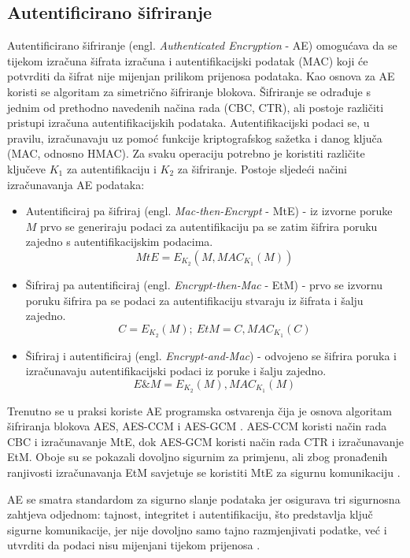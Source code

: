 \subsection{Autentificirano šifriranje}
Autentificirano šifriranje (engl. \emph{Authenticated Encryption} - AE) omogućava
da se tijekom izračuna šifrata izračuna i autentifikacijski podatak (MAC) koji
će potvrditi da šifrat nije mijenjan prilikom prijenosa podataka. Kao osnova za
AE koristi se algoritam za simetrično šifriranje blokova. Šifriranje se
odrađuje s jednim od prethodno navedenih načina rada (CBC, CTR), ali postoje različiti
pristupi izračuna autentifikacijskih podataka. Autentifikacijski podaci se, u
pravilu, izračunavaju uz pomoć funkcije kriptografskog sažetka i danog ključa
(MAC, odnosno HMAC). Za svaku operaciju potrebno je koristiti različite
ključeve $K_1$ za autentifikaciju i $K_2$ za šifriranje. Postoje sljedeći načini
izračunavanja AE podataka:
\begin{itemize}
\item Autentificiraj pa šifriraj (engl. \emph{Mac-then-Encrypt} - MtE) - iz izvorne
poruke $M$ prvo se generiraju podaci za autentifikaciju pa se zatim šifrira poruku
zajedno s autentifikacijskim podacima.
$$MtE=E_{K_2}(M,MAC_{K_1}(M))$$
\item Šifriraj pa autentificiraj (engl. \emph{Encrypt-then-Mac} - EtM) - prvo se
izvornu poruku šifrira pa se podaci za autentifikaciju stvaraju iz šifrata i
šalju zajedno.
$$C=E_{K_2}(M);\ EtM=C,MAC_{K_1}(C)$$
\item Šifriraj i autentificiraj (engl. \emph{Encrypt-and-Mac}) - odvojeno se
šifrira poruka i izračunavaju autentifikacijski podaci iz poruke i šalju
zajedno.
$$E\&M=E_{K_2}(M),MAC_{K_1}(M)$$
\end{itemize}

Trenutno se u praksi koriste AE programska ostvarenja čija je osnova algoritam
šifriranja
blokova AES, AES-CCM \cite{rfc6655} i AES-GCM \cite{rfc5288}. AES-CCM koristi
način rada CBC i izračunavanje MtE, dok AES-GCM koristi način rada CTR i
izračunavanje EtM. Oboje su se pokazali dovoljno sigurnim za primjenu, ali zbog
pronađenih ranjivosti izračunavanja EtM savjetuje se koristiti MtE za sigurnu
komunikaciju \cite{rfc7366}.

AE se smatra standardom za sigurno slanje podataka jer osigurava tri sigurnosna
zahtjeva odjednom: tajnost, integritet i autentifikaciju, što predstavlja ključ
sigurne komunikacije, jer nije dovoljno samo tajno razmjenjivati podatke, već i
utvrditi da podaci nisu mijenjani tijekom prijenosa
\cite[str. 54]{van2011encyclopedia}.

